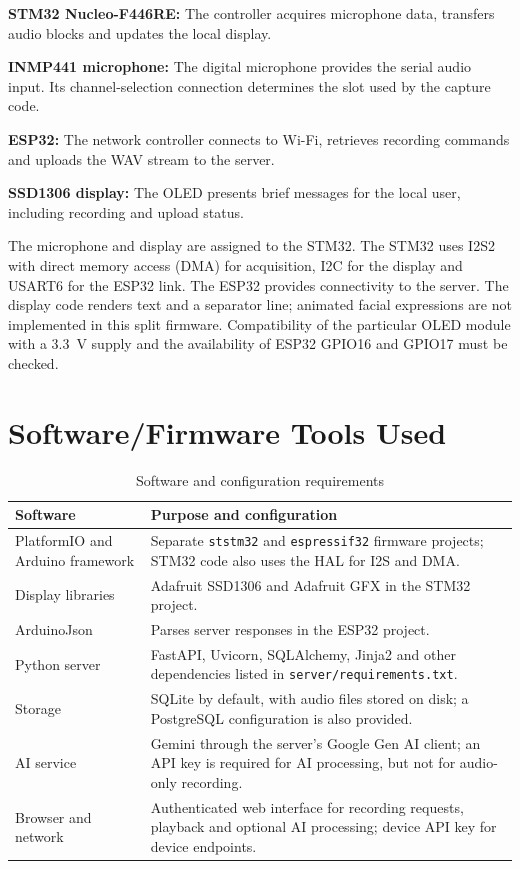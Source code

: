 \textbf{STM32 Nucleo-F446RE:} The controller acquires microphone data, transfers audio blocks and updates the local display.

\textbf{INMP441 microphone:} The digital microphone provides the serial audio input. Its channel-selection connection determines the slot used by the capture code.

\textbf{ESP32:} The network controller connects to Wi-Fi, retrieves recording commands and uploads the WAV stream to the server.

\textbf{SSD1306 display:} The OLED presents brief messages for the local user, including recording and upload status.

The microphone and display are assigned to the STM32. The STM32 uses I2S2 with direct memory access (DMA) for acquisition, I2C for the display and USART6 for the ESP32 link. The ESP32 provides connectivity to the server. The display code renders text and a separator line; animated facial expressions are not implemented in this split firmware. Compatibility of the particular OLED module with a 3.3~V supply and the availability of ESP32 GPIO16 and GPIO17 must be checked.

\section{Software/Firmware Tools Used}
\begin{table}[htbp]
\centering
\caption{Software and configuration requirements}
\label{tab:software}
\small
\begin{tabularx}{\textwidth}{@{}lX@{}}
\toprule
Software & Purpose and configuration \\
\midrule
PlatformIO and Arduino framework & Separate \texttt{ststm32} and \texttt{espressif32} firmware projects; STM32 code also uses the HAL for I2S and DMA. \\
Display libraries & Adafruit SSD1306 and Adafruit GFX in the STM32 project. \\
ArduinoJson & Parses server responses in the ESP32 project. \\
Python server & FastAPI, Uvicorn, SQLAlchemy, Jinja2 and other dependencies listed in \texttt{server/requirements.txt}. \\
Storage & SQLite by default, with audio files stored on disk; a PostgreSQL configuration is also provided. \\
AI service & Gemini through the server's Google Gen AI client; an API key is required for AI processing, but not for audio-only recording. \\
Browser and network & Authenticated web interface for recording requests, playback and optional AI processing; device API key for device endpoints. \\
\bottomrule
\end{tabularx}
\end{table}

